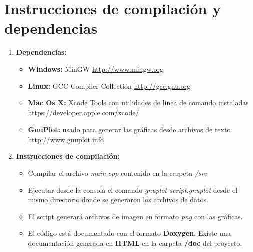 \section{Instrucciones de compilación y dependencias}
\begin{enumerate}
	\item \textbf{Dependencias:}
		\begin{itemize}
			\item \textbf{Windows:}  MinGW  \url{http://www.mingw.org}
			\item \textbf{Linux:} GCC Compiler Collection  \url{http://gcc.gnu.org}
			\item \textbf{Mac Os X:} Xcode Tools con utilidades de línea de comando instaladas  							\url{https://developer.apple.com/xcode/}
			\item \textbf{GnuPlot:}  usado para generar las gráficas desde archivos de texto 								\url{http://www.gnuplot.info}
		\end{itemize}
	\item \textbf{Instrucciones de compilación:}
			\begin{itemize}
			\item Compilar el archivo \textit{main.cpp} contenido en la carpeta \textit{/src}
			\item Ejecutar desde la consola el comando \textit{gnuplot script.gnuplot} desde el 					mismo directorio donde se generaron los archivos de datos.
			\item El script generará archivos de imagen en formato \textit{png} con las gráficas.
			\item El código está documentado con el formato \textbf{Doxygen}. Existe una documentación generada en \textbf{HTML} en la carpeta \textbf{/doc} del proyecto.
			\end{itemize}
\end{enumerate}

